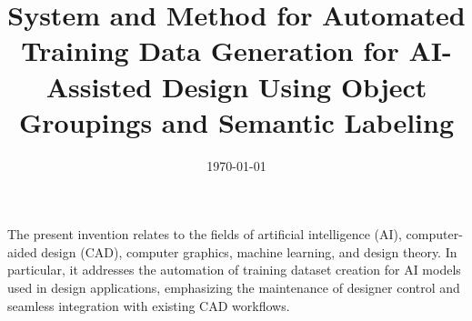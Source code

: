 











\title{System and Method for Automated Training Data Generation for AI-Assisted Design Using Object Groupings and Semantic Labeling}
\date{\today}

\maketitle


\patentParagraph
The present invention relates to the fields of artificial intelligence (AI), computer-aided design (CAD), computer graphics, machine learning, and design theory. In particular, it addresses the automation of training dataset creation for AI models used in design applications, emphasizing the maintenance of designer control and seamless integration with existing CAD workflows.


